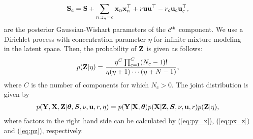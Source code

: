 \begin{align}
\mathbf{S}_{c}=\mathbf{S}+\sum_{n:z_{n}=c}{\bf{x}}_{n}{\bf{x}}_{n}^{\top} + r{\bf{u}}{\bf{u}}^{\top}
 - r_{c}{\bf{u}}_{c}{\bf{u}}_{c}^{\top},
\end{align}
are the posterior Gaussian-Wishart parameters of the $c^{\text{\tiny th}}$ component.
We use a Dirichlet process with concentration parameter $\eta$ for infinite mixture modeling~\cite{maceachern1998estimating} in the latent space.
Then, the probability of $\mathbf{Z}$ is given as follows:
%
\begin{align}
p(\mathbf{Z}|\eta) = 
\frac{\eta^{C}\prod_{c=1}^{C}(N_{c}-1)!}
{\eta(\eta+1)\cdots(\eta+N-1)},
\label{eq:pz}
\end{align}
%
where $C$ is the number of components for which $N_{c}>0$.
The joint distribution is given by
%
\begin{align}
p(\mathbf{Y},\mathbf{X},\mathbf{Z}|\bm{\theta},\bm{S},\nu,{\bf{u}},r,\eta)
 = p(\mathbf{Y}|\mathbf{X},\bm{\theta})
 p(\mathbf{X}|\mathbf{Z},\bm{S},\nu,{\bf{u}},r)p(\mathbf{Z}|\eta),
\label{eq:joint}
\end{align}
%
where factors in the right hand side can be calculated by (\ref{eq:py_x}), (\ref{eq:px_z}) and (\ref{eq:pz}), respectively.

